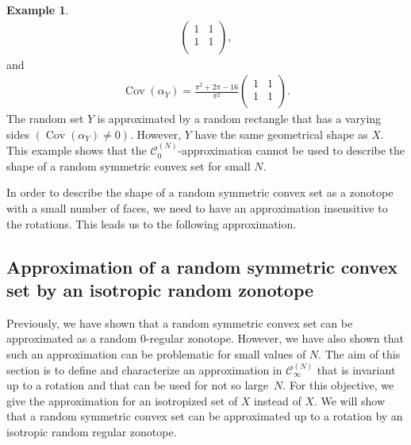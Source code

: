 \documentclass[numbers,compress,v1.0.1]{vmsta}
\theoremstyle{definition}
\newtheorem{example}{Example}
\begin{document}
\begin{example}
\begin{align*}
%
\begin{pmatrix}1&1\\
1&1\\
\end{pmatrix} %
,
\end{align*}
%
and
%
\begin{align*}
\operatorname{Cov}(\alpha_Y)=\frac{\pi^2+2\pi-16}{\pi^2} %
\begin{pmatrix}1&1\\
1&1\\
\end{pmatrix} %
.
\end{align*}
%
The random set $Y$ is approximated by a random rectangle that has a
varying sides $(\operatorname{Cov}(\alpha_Y)\neq0)$. However, $Y$ have the same
geometrical shape as $X$. This example shows that the $\mathcal
{C}^{(N)}_0$-approximation cannot be used to describe the shape of a
random symmetric convex set for small $N$.
\label{ex:isotropicsquare}
\end{example}

In order to describe the shape of a random symmetric convex set as a
zonotope with a small number of faces, we need to have an approximation
insensitive to the rotations. This leads us to the following approximation.
\subsection{Approximation of a random symmetric convex set by an
isotropic random zonotope}

Previously, we have shown that a random symmetric convex set can be
approximated as a random $0$-regular zonotope. However, we have also
shown that such an approximation can be problematic for small values of
$N$. The aim of this section is to define and characterize an
approximation in $ \mathcal{C}^{(N)}_\infty$ that is invariant up to a
rotation and that can be used for not so large~$N$. For this objective,
we give the approximation for an isotropized set of $X$ instead of $X$.
We will show that a random symmetric convex set can be approximated up
to a rotation by an isotropic random regular zonotope.
\end{document}
